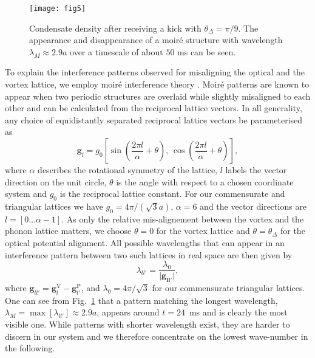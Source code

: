     			\begin{figure}[bt]
    			\texttt{[image: fig5]}
    			\caption{Condensate density after receiving a kick with $\theta_\Delta=\pi/9$. The appearance and disappearance of a moir\'e structure with wavelength $\lambda_M \approx 2.9 a$ over a timescale of about $50$ ms can be seen.}
    			\label{fig:dtheta20_ev}
    		\end{figure}

    To explain the interference patterns observed for misaligning the optical and the vortex lattice, we employ moir\'e interference theory \cite{SS:Kerman_jphyscon_2012}. Moir\'e patterns are known to appear when two periodic structures are overlaid while slightly misaligned to each other and can be calculated from the reciprocal lattice vectors. In all generality, any choice of equidistantly separated reciprocal lattice vectors be parameterised as
    	\begin{equation}
    		\mathbf{g}_{l} = g_0 \left[ \sin\left( \frac{2\pi l}{\alpha}+\theta \right),\, \cos\left( \frac{2\pi l}{\alpha} +\theta\right) \right],
    	\end{equation}
    where $\alpha$ describes the rotational symmetry of the lattice, $l$ labels the vector direction on the unit circle, $\theta$ is the angle with respect to a chosen coordinate system and $g_0$ is the reciprocal lattice constant. For our commensurate and triangular lattices we have $g_0=4\pi/(\sqrt{3}a)$, $\alpha=6$ and the vector directions are $l=\left[0\dots\alpha-1\right]$. As only the relative mis-alignement between the vortex and the phonon lattice matters, we choose $\theta=0$ for the vortex lattice and $\theta=\theta_\Delta$ for the optical potential alignment.
    	All possible wavelengths that can appear in an interference pattern between two such lattices in real space are then given by
    	\begin{equation}
    		\lambda_{ll'} = \frac{\lambda_0}{|\mathbf{\mathbf{g}_{ll'}|}},
    		\label{eq:InterferenceVectors}
    	\end{equation}
    	where
    	$\mathbf{g}_{ll'}=\mathbf{g}_{l}^\text{V}-\mathbf{g}_{l'}^\text{P}$, and
    	$\lambda_0 = 4\pi/\sqrt{3}$ for our commensurate triangular lattices.
    One can see from Fig.~\ref{fig:dtheta20_ev} that a pattern matching the longest wavelength, $\lambda_M= \max[\lambda_{ll'}] \approx 2.9 a$, appears around $t=24$~ms and is clearly the most visible one. While patterns with shorter wavelength exist, they are harder to discern in our system and we therefore concentrate on the lowest wave-number in the following.

